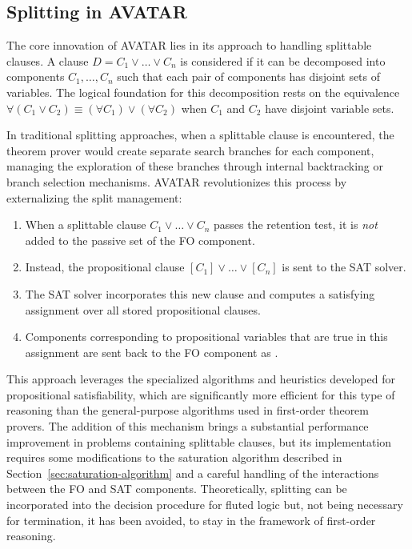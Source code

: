 \subsection{Splitting in AVATAR}\label{subsec:avatar-splitting}

The core innovation of AVATAR lies in its approach to handling splittable clauses.
A clause \(D = C_1 \lor \ldots \lor C_n\) is considered  if it can be decomposed into components \(C_1, \ldots, C_n\) such that each pair of components has disjoint sets of variables.
The logical foundation for this decomposition rests on the equivalence \(\forall(C_1 \lor C_2) \equiv (\forall C_1) \lor (\forall C_2)\) when \(C_1\) and \(C_2\) have disjoint variable sets.

In traditional splitting approaches, when a splittable clause is encountered, the theorem prover would create separate search branches for each component, managing the exploration of these branches through internal backtracking or branch selection mechanisms.
AVATAR revolutionizes this process by externalizing the split management:

\begin{enumerate}
  \item When a splittable clause \(C_1 \lor \ldots \lor C_n\) passes the retention test, it is \emph{not} added to the passive set of the FO component.
  \item Instead, the propositional clause \([C_1] \lor \ldots \lor [C_n]\) is sent to the SAT solver.
  \item The SAT solver incorporates this new clause and computes a satisfying assignment over all stored propositional clauses.
  \item Components corresponding to propositional variables that are true in this assignment are sent back to the FO component as .
\end{enumerate}
This approach leverages the specialized algorithms and heuristics developed for propositional satisfiability, which are significantly more efficient for this type of reasoning than the general-purpose algorithms used in first-order theorem provers.
The addition of this mechanism brings a substantial performance improvement in problems containing splittable clauses, but its implementation requires some modifications to the saturation algorithm described in Section~\ref{sec:saturation-algorithm} and a careful handling of the interactions between the FO and SAT components.
Theoretically, splitting can be incorporated into the decision procedure for fluted logic but, not being necessary for termination, it has been avoided, to stay in the framework of first-order reasoning.
